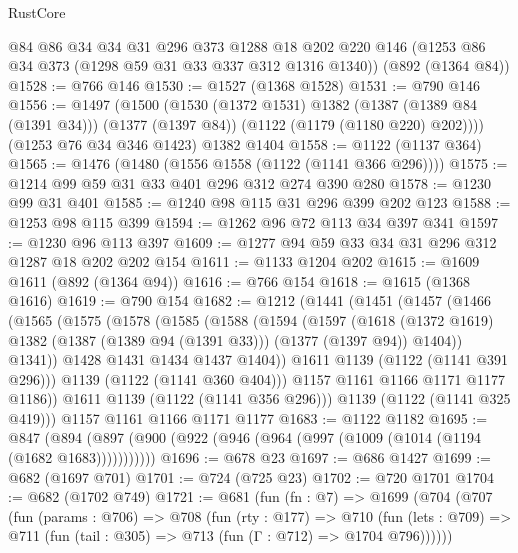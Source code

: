 \begin{lexlean}{RustCore}
\begin{coremodule}
    @84
    @86
    @34
    @34
    @31
    @296
    @373
    @1288
    @18
    @202
    @220
    @146
    (@1253 @86 @34 @373 (@1298 @59 @31 @33 @337 @312 @1316 @1340))
    (@892 (@1364 @84))
@1528 := @766 @146
@1530 := @1527 (@1368 @1528)
@1531 := @790 @146
@1556 := @1497
    (@1500
      (@1530
        (@1372 @1531)
        @1382
        (@1387 (@1389 @84 (@1391 @34)))
        (@1377 (@1397 @84))
        (@1122 (@1179 (@1180 @220) @202))))
    (@1253 @76 @34 @346 @1423)
    @1382
    @1404
@1558 := @1122 (@1137 @364)
@1565 := @1476 (@1480 (@1556 @1558 (@1122 (@1141 @366 @296))))
@1575 := @1214 @99 @59 @31 @33 @401 @296 @312 @274 @390 @280
@1578 := @1230 @99 @31 @401
@1585 := @1240 @98 @115 @31 @296 @399 @202 @123
@1588 := @1253 @98 @115 @399
@1594 := @1262 @96 @72 @113 @34 @397 @341
@1597 := @1230 @96 @113 @397
@1609 := @1277 @94 @59 @33 @34 @31 @296 @312 @1287 @18 @202 @202 @154
@1611 := @1133 @1204 @202
@1615 := @1609 @1611 (@892 (@1364 @94))
@1616 := @766 @154
@1618 := @1615 (@1368 @1616)
@1619 := @790 @154
@1682 := @1212
    (@1441
      (@1451
        (@1457
          (@1466
            (@1565
              (@1575
                (@1578
                  (@1585
                    (@1588
                      (@1594
                        (@1597
                          (@1618
                            (@1372 @1619)
                            @1382
                            (@1387 (@1389 @94 (@1391 @33)))
                            (@1377 (@1397 @94))
                            @1404))
                        @1341))
                    @1428
                    @1431
                    @1434
                    @1437
                    @1404))
                @1611
                @1139
                (@1122 (@1141 @391 @296)))
              @1139
              (@1122 (@1141 @360 @404)))
            @1157
            @1161
            @1166
            @1171
            @1177
            @1186))
        @1611
        @1139
        (@1122 (@1141 @356 @296)))
      @1139
      (@1122 (@1141 @325 @419)))
    @1157
    @1161
    @1166
    @1171
    @1177
@1683 := @1122 @1182
@1695 := @847 (@894 (@897 (@900 (@922 (@946 (@964 (@997 (@1009 (@1014 (@1194 (@1682 @1683)))))))))))
@1696 := @678 @23
@1697 := @686 @1427
@1699 := @682 (@1697 @701)
@1701 := @724 (@725 @23)
@1702 := @720 @1701
@1704 := @682 (@1702 @749)
@1721 := @681
    (fun (fn : @7) =>
    @1699
      (@704
        (@707
          (fun (params : @706) =>
          @708
            (fun (rty : @177) =>
            @710
              (fun (lets : @709) =>
              @711 (fun (tail : @305) => @713 (fun (Γ : @712) => @1704 @796))))))

\end{coremodule}
\end{lexlean}

